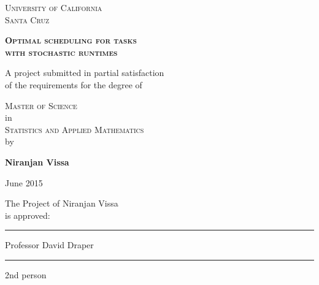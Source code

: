 \documentclass[12pt]{report}
\begin{document}
\begin{titlepage}

\begin{center}

\textsc{\Large University of California \\
Santa Cruz } \\

\vspace*{0.15in}

\textsc{\Large \textbf{Optimal scheduling for tasks \\with stochastic runtimes}}

\vspace*{0.15in}

\large 

A project submitted in partial satisfaction \vspace*{-0.1in} \\
of the requirements for the degree of \\ 

\vspace*{0.15in}

\textsc{\Large Master of Science} \\

\large in \\ 

\textsc{\Large Statistics and Applied Mathematics} \\

\large by \\

\vspace*{0.15in}

\textbf{Niranjan Vissa} \\

\vspace*{0.15in}

June 2015

\large

\vspace*{0.15in}

\begin{flushright}

The Project of Niranjan Vissa \\is approved: \vspace*{-0.1in}

\vspace*{0.2in}

\rule{2.5in}{.01cm}

Professor David Draper

\vspace*{0.2in}

\rule{2.5in}{.01cm}

2nd person

\end{flushright}

\end{center}

\end{titlepage}
\end{document}
